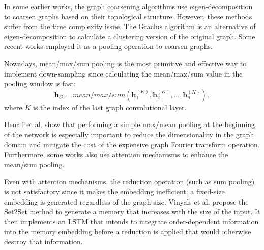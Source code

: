     In some earlier works, the graph coarsening algorithms use eigen-decomposition to coarsen graphs based on their topological structure. However, these methods suffer from the time complexity issue. The Graclus algorithm \cite{dhillon2007weighted} is an alternative of eigen-decomposition to calculate a clustering version of the original graph. Some recent works \cite{levie2017cayleynets} employed it as a pooling operation to coarsen graphs. 
    
    Nowadays, mean/max/sum pooling is the most primitive and effective way to implement down-sampling since calculating the mean/max/sum value in the pooling window is fast:
    \begin{equation}
    \label{eq:basicpool}
    \mathbf{h}_G = mean/max/sum(\mathbf{h}_1^{(K)}, \mathbf{h}_2^{(K)}, ..., \mathbf{h}_n^{(K)}),
    \end{equation}
    where $K$ is the index of the last graph convolutional layer.
    
    
    Henaff et al. \cite{henaff2015deep} show that performing a simple max/mean pooling at the beginning of the network is especially important to reduce the dimensionality in the graph domain and mitigate the cost of the expensive graph Fourier transform operation. Furthermore, some works \cite{li2015gated, gilmer2017neural, tran2018filter} also use attention mechanisms to enhance the mean/sum pooling.
    
    Even with attention mechanisms, the reduction operation (such as sum pooling) is not satisfactory since it makes the embedding inefficient: a fixed-size embedding is generated regardless of the graph size. Vinyals et al. \cite{vinyals2015order} propose the Set2Set method to generate a memory that increases with the size of the input. It then implements an LSTM that intends to integrate order-dependent information into the memory embedding before a reduction is applied that would otherwise destroy that information.
    
    
    
